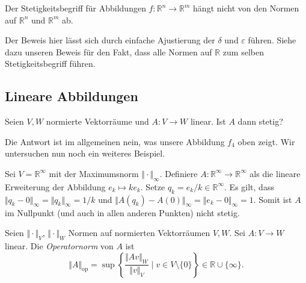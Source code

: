 \documentclass[../main.tex]{subfiles}
\begin{document}
\begin{corollary}\label{cor:continuity-independent}
  Der Stetigkeitsbegriff für Abbildungen
  $f \colon \mathbb{R}^n \to \mathbb{R}^m$ 
  hängt nicht von den Normen auf $\mathbb{R}^n$ 
  und $\mathbb{R}^m$ ab.
\end{corollary}

Der Beweis hier lässt sich durch einfache Ajustierung
der $\delta$ und $\varepsilon$ führen.
Siehe dazu unseren Beweis für den Fakt,
dass alle Normen auf $\mathbb{R}$ zum
selben Stetigkeitsbegriff führen.

\subsection*{Lineare Abbildungen}
\begin{question}
Seien $V, W$ normierte Vektorräume und
$A \colon V \to W$ linear.
Ist $A$ dann stetig?
\end{question}

Die Antwort ist im allgemeinen nein, was unsere
Abbildung $f_4$ oben zeigt. Wir untersuchen
nun noch ein weiteres Beispiel.

\begin{example}
  Sei $V = \mathbb{R}^{\infty}$ mit der
  Maximumsnorm $\Vert \cdot \Vert_{\infty}$.
  Definiere $A \colon \mathbb{R}^{\infty} \to \mathbb{R}^{\infty}$ 
  als die lineare Erweiterung der Abbildung $e_k \mapsto ke_k$.
  Setze  $q_k = e_k/k \in \mathbb{R}^{\infty}$.
  Es gilt, dass
  \(
    \Vert q_k - 0 \Vert_{\infty} = \Vert q_k \Vert_{\infty} = 1/k
  \)
  und $\Vert A(q_k) - A(0) \Vert_{\infty} = \Vert e_k - 0 \Vert_{\infty}
  = 1$. Somit ist $A$ im Nullpunkt (und auch in allen anderen Punkten)
  nicht stetig.
\end{example}

\begin{definition}
  Seien $\Vert \cdot \Vert_V$, $\Vert \cdot \Vert_W$ 
  Normen auf normierten Vektorräumen $V, W$.
  Sei $A \colon V \to W$ linear.
  Die \emph{Operatornorm} von $A$ ist
  \[
    \Vert A \Vert_{\text{op}} = \sup
    \left\{\frac{\Vert Av \Vert_W}{\Vert v \Vert_V} \mid v \in
    V \setminus \{0\}\right\} \in \mathbb{R} \cup \{\infty\}.
  \]
\end{definition}
\end{document}
